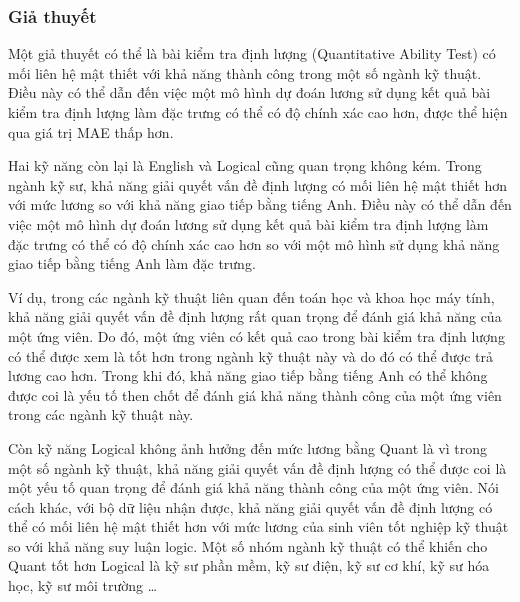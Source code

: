 \documentclass[]{article}
\begin{document}
\subsubsection{Giả thuyết}
Một giả thuyết có thể là bài kiểm tra định lượng (Quantitative Ability Test) có mối liên hệ mật thiết với khả năng thành công trong một số ngành kỹ thuật. Điều này có thể dẫn đến việc một mô hình dự đoán lương sử dụng kết quả bài kiểm tra định lượng làm đặc trưng có thể có độ chính xác cao hơn, được thể hiện qua giá trị MAE thấp hơn.

Hai kỹ năng còn lại là English và Logical cũng quan trọng không kém. Trong ngành kỹ sư, khả năng giải quyết vấn đề định lượng có mối liên hệ mật thiết hơn với mức lương so với khả năng giao tiếp bằng tiếng Anh. Điều này có thể dẫn đến việc một mô hình dự đoán lương sử dụng kết quả bài kiểm tra định lượng làm đặc trưng có thể có độ chính xác cao hơn so với một mô hình sử dụng khả năng giao tiếp bằng tiếng Anh làm đặc trưng.

Ví dụ, trong các ngành kỹ thuật liên quan đến toán học và khoa học máy tính, khả năng giải quyết vấn đề định lượng rất quan trọng để đánh giá khả năng của một ứng viên. Do đó, một ứng viên có kết quả cao trong bài kiểm tra định lượng có thể được xem là tốt hơn trong ngành kỹ thuật này và do đó có thể được trả lương cao hơn. Trong khi đó, khả năng giao tiếp bằng tiếng Anh có thể không được coi là yếu tố then chốt để đánh giá khả năng thành công của một ứng viên trong các ngành kỹ thuật này.

Còn kỹ năng Logical không ảnh hưởng đến mức lương bằng Quant là vì trong một số ngành kỹ thuật, khả năng giải quyết vấn đề định lượng có thể được coi là một yếu tố quan trọng để đánh giá khả năng thành công của một ứng viên. Nói cách khác, với bộ dữ liệu nhận được, khả năng giải quyết vấn đề định lượng có thể có mối liên hệ mật thiết hơn với mức lương của sinh viên tốt nghiệp kỹ thuật so với khả năng suy luận logic. Một số nhóm ngành kỹ thuật có thể khiến cho Quant tốt hơn Logical là kỹ sư phần mềm, kỹ sư điện, kỹ sư cơ khí, kỹ sư hóa học, kỹ sư môi trường \dots
\end{document}
